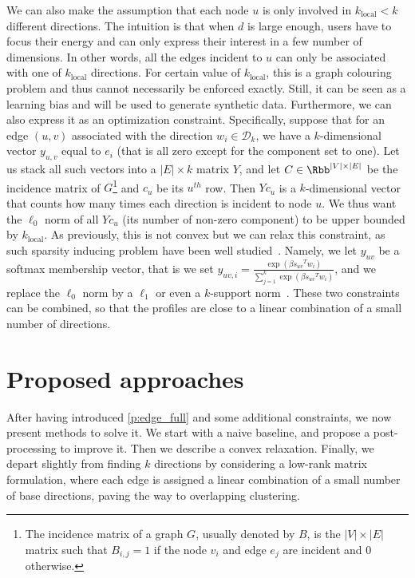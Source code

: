 We can also make the assumption that each node $u$ is only involved in $k_\mathrm{local} < k$
different directions. The intuition is that when $d$ is large enough, users have to focus their
energy and can only express their interest in a few number of dimensions. In other words, all the
edges incident to $u$ can only be associated with one of $k_\mathrm{local}$ directions. For
certain value of
$k_\mathrm{local}$, this is a \NPc{} graph colouring problem and thus cannot necessarily be enforced
exactly. Still, it can be seen as a learning bias and will be used to generate synthetic data.
Furthermore, we can also express it as an optimization constraint. Specifically, suppose that for
an edge $(u,v)$ associated with the direction $w_i \in \mathcal{D}_k$, we have a $k$-dimensional
vector $y_{u,v}$ equal to $e_i$ (that is all zero except for the \ith{} component set to one). Let
us stack all such vectors into a $|E| \times k$ matrix $Y$, and let $C \in \Rbb^{|V| \times |E|}$ be
the incidence matrix of $G$\footnote{The incidence matrix of a graph $G$, usually denoted by $B$, is
the $|V| \times |E|$ matrix such that $B_{i,j} = 1$ if the node $v_i$ and edge $e_j$ are incident
and 0 otherwise.} and $c_u$ be its $u^{th}$ row. Then $Yc_u$ is a $k$-dimensional vector that counts
how many times each direction is incident to node $u$. We thus want the $\ell_0$ norm of all $Yc_u$
(\ie its number of non-zero component) to be upper bounded by $k_\mathrm{local}$. As previously,
this is not convex but we can relax this constraint, as such sparsity inducing problem have been
well studied~\autocite{sparseOptim12}. Namely, we let $y_{uv}$ be a softmax membership vector, that
is we set $y_{uv,i} = \frac{\exp(\beta{s_{uv}}^T w_i)}{\sum_{j=1}^k \exp(\beta {s_{uv}}^T w_i)}$,
and we replace the $\ell_0$ norm by a $\ell_1$ or even a $k$-support norm~\autocite{KsupportNorm12}.
These two constraints can be combined, so that the profiles are close to a linear combination of a
small number of directions.

\section{Proposed approaches}
\label{sec:edge_methods}

After having introduced \autoref{p:edge_full} and some additional constraints, we now present
methods to solve it. We start with a naive baseline, and propose a post-processing to improve it.
Then we describe a convex relaxation. Finally, we depart slightly from finding $k$ directions by
considering a low-rank matrix formulation, where each edge is assigned a linear combination of a
small number of base directions, paving the way to overlapping clustering.

